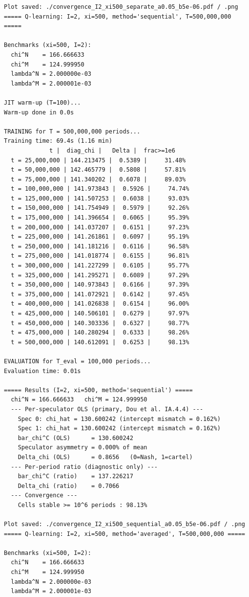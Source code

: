 \begin{lstlisting}[style=outputstyle]
Plot saved: ./convergence_I2_xi500_separate_a0.05_b5e-06.pdf / .png
===== Q-learning: I=2, xi=500, method='sequential', T=500,000,000 =====

Benchmarks (xi=500, I=2):
  chi^N    = 166.666633
  chi^M    = 124.999950
  lambda^N = 2.000000e-03
  lambda^M = 2.000001e-03

JIT warm-up (T=100)...
Warm-up done in 0.0s

TRAINING for T = 500,000,000 periods...
Training time: 69.4s (1.16 min)
             t |  diag_chi |   Delta |  frac>=1e6
  t = 25,000,000 | 144.213475 |  0.5389 |     31.48%
  t = 50,000,000 | 142.465779 |  0.5808 |     57.81%
  t = 75,000,000 | 141.340202 |  0.6078 |     89.03%
  t = 100,000,000 | 141.973843 |  0.5926 |     74.74%
  t = 125,000,000 | 141.507253 |  0.6038 |     93.03%
  t = 150,000,000 | 141.754949 |  0.5979 |     92.26%
  t = 175,000,000 | 141.396654 |  0.6065 |     95.39%
  t = 200,000,000 | 141.037207 |  0.6151 |     97.23%
  t = 225,000,000 | 141.261861 |  0.6097 |     95.19%
  t = 250,000,000 | 141.181216 |  0.6116 |     96.58%
  t = 275,000,000 | 141.018774 |  0.6155 |     96.81%
  t = 300,000,000 | 141.227299 |  0.6105 |     95.77%
  t = 325,000,000 | 141.295271 |  0.6089 |     97.29%
  t = 350,000,000 | 140.973843 |  0.6166 |     97.39%
  t = 375,000,000 | 141.072921 |  0.6142 |     97.45%
  t = 400,000,000 | 141.026838 |  0.6154 |     96.00%
  t = 425,000,000 | 140.506101 |  0.6279 |     97.97%
  t = 450,000,000 | 140.303336 |  0.6327 |     98.77%
  t = 475,000,000 | 140.280294 |  0.6333 |     98.26%
  t = 500,000,000 | 140.612091 |  0.6253 |     98.13%

EVALUATION for T_eval = 100,000 periods...
Evaluation time: 0.01s

===== Results (I=2, xi=500, method='sequential') =====
  chi^N = 166.666633   chi^M = 124.999950
  --- Per-speculator OLS (primary, Dou et al. IA.4.4) ---
    Spec 0: chi_hat = 130.600242 (intercept mismatch = 0.162%)
    Spec 1: chi_hat = 130.600242 (intercept mismatch = 0.162%)
    bar_chi^C (OLS)      = 130.600242
    Speculator asymmetry = 0.000% of mean
    Delta_chi (OLS)      = 0.8656   (0=Nash, 1=cartel)
  --- Per-period ratio (diagnostic only) ---
    bar_chi^C (ratio)    = 137.226217
    Delta_chi (ratio)    = 0.7066
  --- Convergence ---
    Cells stable >= 10^6 periods : 98.13%

Plot saved: ./convergence_I2_xi500_sequential_a0.05_b5e-06.pdf / .png
===== Q-learning: I=2, xi=500, method='averaged', T=500,000,000 =====

Benchmarks (xi=500, I=2):
  chi^N    = 166.666633
  chi^M    = 124.999950
  lambda^N = 2.000000e-03
  lambda^M = 2.000001e-03


\end{lstlisting}
